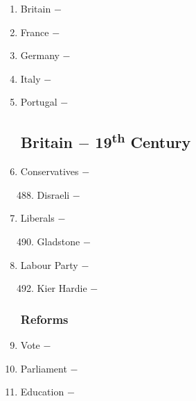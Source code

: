 \documentclass[12pt]{article}
\begin{document}
\begin{enumerate}
\item Britain $-$ 

\item France $-$ 

\item Germany $-$ 

\item Italy $-$ 

\item Portugal $-$ 

\subsection{Britain $-$ 19\textsuperscript{th} Century}

\item Conservatives $-$ 

\begin{enumerate}[label=\arabic{*}.]
\setcounter{enumii}{487}

\item Disraeli $-$

\end{enumerate}
\setcounter{enumi}{488}

\item Liberals $-$ 

\begin{enumerate}[label=\arabic{*}.]
\setcounter{enumii}{489}

\item Gladstone $-$

\end{enumerate}
\setcounter{enumi}{490}

\item Labour Party $-$

\begin{enumerate}[label=\arabic{*}.]
\setcounter{enumii}{491}

\item Kier Hardie $-$ 

\end{enumerate}
\setcounter{enumi}{492}

\subsubsection{Reforms}

\item Vote $-$ 

\item Parliament $-$ 

\item Education $-$ 


\end{enumerate}
\end{document}
